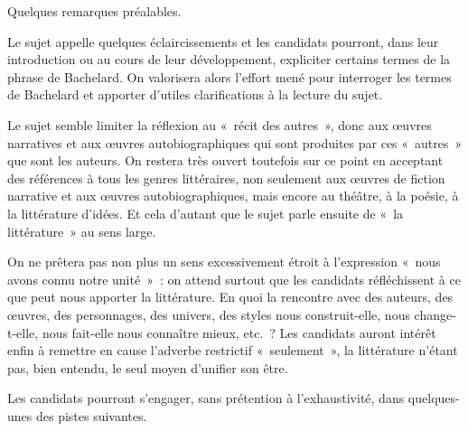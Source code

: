 		{Quelques remarques préalables.
	
		Le sujet appelle quelques éclaircissements et les candidats pourront, dans leur
introduction ou au cours de leur développement, expliciter certains termes de la phrase
de Bachelard. On valorisera alors l'effort mené pour interroger les termes de Bachelard
et apporter d'utiles clarifications à la lecture du sujet.

Le sujet semble limiter la réflexion au «~récit des autres~», donc aux œuvres
narratives et aux œuvres autobiographiques qui sont produites par ces «~autres~» que
sont les auteurs. On restera très ouvert toutefois sur ce point en acceptant des
références à tous les genres littéraires, non seulement aux œuvres de fiction narrative
et aux œuvres autobiographiques, mais encore au théâtre, à la poésie, à la littérature
d'idées. Et cela d'autant que le sujet parle ensuite de «~la littérature~» au sens large.

On ne prêtera pas non plus un sens excessivement étroit à l'expression «~nous
avons connu notre unité~»~: on attend surtout que les candidats réfléchissent à ce que
peut nous apporter la littérature. En quoi la rencontre avec des auteurs, des œuvres,
des personnages, des univers, des styles nous construit-elle, nous change-t-elle, nous
fait-elle nous connaître mieux, etc.~?
Les candidats auront intérêt enfin à remettre en cause l'adverbe restrictif
«~seulement~», la littérature n'étant pas, bien entendu, le seul moyen d'unifier son être.

Les candidats pourront s'engager, sans prétention à l'exhaustivité, dans quelques-unes des pistes suivantes.

}
